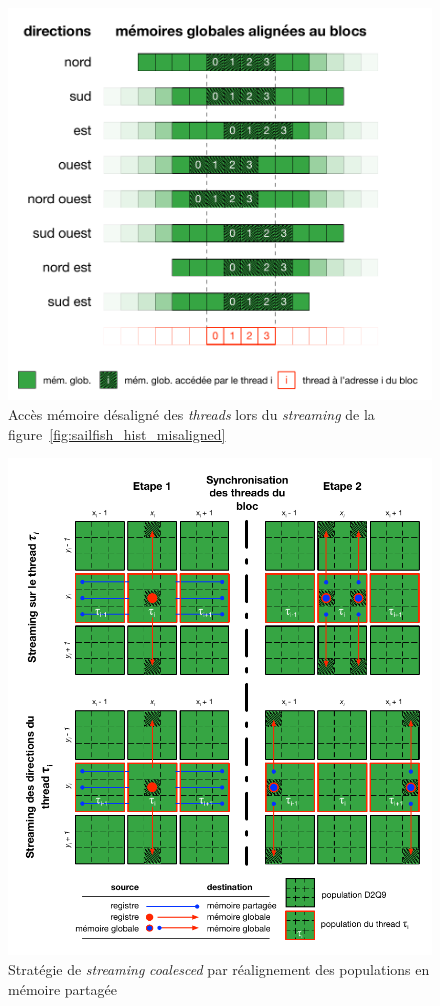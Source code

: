 \begin{figure}[h]
	\centering
	\includegraphics[fbox,scale=0.95]{images/streaming/sailfish_hist_dir_misaligned.pdf}
	\caption{Accès mémoire désaligné des \textit{threads} lors du \textit{streaming} de la figure~\ref{fig:sailfish_hist_misaligned}}
	\label{fig:sailfish_hist_dir_misaligned}
\end{figure}

\begin{figure}[h]
	\centering
	\includegraphics[fbox,scale=1.1]{images/streaming/sailfish_hist_ti.pdf}
	\caption{Stratégie de \textit{streaming} \textit{coalesced} par réalignement des populations en mémoire partagée}
	\label{fig:sailfish_hist_ti}
\end{figure}


